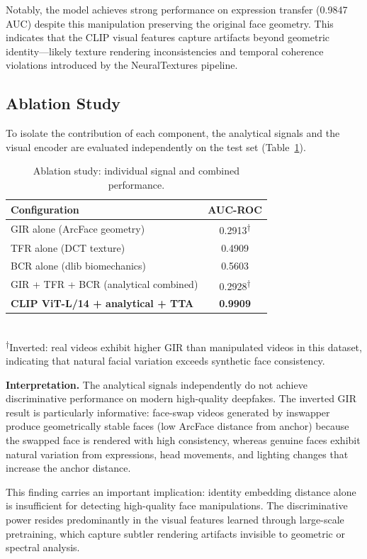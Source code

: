 \documentclass[11pt, twocolumn]{article}
\begin{document}
Notably, the model achieves strong performance on expression transfer (0.9847 AUC) despite this manipulation preserving the original face geometry. This indicates that the CLIP visual features capture artifacts beyond geometric identity---likely texture rendering inconsistencies and temporal coherence violations introduced by the NeuralTextures pipeline.

\subsection{Ablation Study}

To isolate the contribution of each component, the analytical signals and the visual encoder are evaluated independently on the test set (Table~\ref{tab:ablation}).

\begin{table}[H]
\centering
\caption{Ablation study: individual signal and combined performance.}
\label{tab:ablation}
\small
\begin{tabular}{lc}
\toprule
Configuration & AUC-ROC \\
\midrule
GIR alone (ArcFace geometry) & 0.2913\textsuperscript{†} \\
TFR alone (DCT texture) & 0.4909 \\
BCR alone (dlib biomechanics) & 0.5603 \\
GIR + TFR + BCR (analytical combined) & 0.2928\textsuperscript{†} \\
\midrule
\textbf{CLIP ViT-L/14 + analytical + TTA} & \textbf{0.9909} \\
\bottomrule
\end{tabular}
\\[4pt]
\footnotesize\textsuperscript{†}Inverted: real videos exhibit higher GIR than manipulated videos in this dataset, indicating that natural facial variation exceeds synthetic face consistency.
\end{table}

\textbf{Interpretation.} The analytical signals independently do not achieve discriminative performance on modern high-quality deepfakes. The inverted GIR result is particularly informative: face-swap videos generated by inswapper produce geometrically stable faces (low ArcFace distance from anchor) because the swapped face is rendered with high consistency, whereas genuine faces exhibit natural variation from expressions, head movements, and lighting changes that increase the anchor distance.

This finding carries an important implication: identity embedding distance alone is insufficient for detecting high-quality face manipulations. The discriminative power resides predominantly in the visual features learned through large-scale pretraining, which capture subtler rendering artifacts invisible to geometric or spectral analysis.
\end{document}
